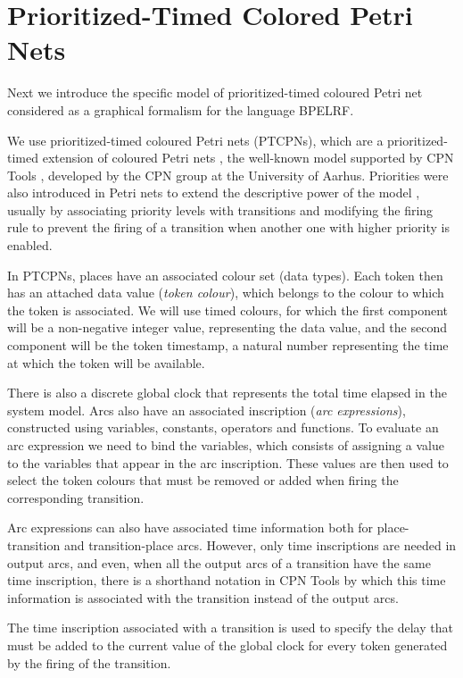 \section{Prioritized-Timed Colored Petri Nets}\label{petrinet}

Next we introduce the specific model of prioritized-timed
coloured Petri net considered as a graphical formalism for the language BPELRF. 
 

We use prioritized-timed coloured Petri nets (PTCPNs), 
which are
a prioritized-timed extension of coloured Petri nets \cite{Jensen97},
the well-known model supported by CPN Tools \cite{CPNTools},
developed by the CPN group at the University of Aarhus.
Priorities were also introduced in Petri nets to extend the descriptive 
power of the model \cite{Bau96,Best92,Pet81}, usually by
associating priority levels with transitions and modifying the firing
rule to prevent the firing of a transition when another one with
higher priority is enabled.

In PTCPNs, places have an associated colour set (data types). 
Each token then  has  an attached data value
({\em token colour}),
which belongs to the colour to which the token is
associated. We will use timed colours, for which the first component
will be a non-negative integer value, representing the data value,
and the second component will be the token timestamp,
a natural number representing the time at which the 
token will be available.

There is also a discrete global clock that represents
the total time elapsed in the system model. Arcs also have 
an associated inscription ({\em arc expressions}),
constructed using variables, constants, operators
and functions. 
To evaluate an arc expression we need to
bind the variables, which consists of assigning
a value to the variables that appear in the
arc inscription. These values are then used to
select the token colours that must be removed or added when
firing the corresponding transition.

Arc expressions can also have associated time information
both for place-transition and transition-place arcs.
However, only time inscriptions are needed
in output arcs, and even, when all the output arcs
of a transition have the same time inscription,
there is a shorthand notation in CPN Tools
by which this time information is associated with
the transition instead of the output arcs.

The time inscription associated with a transition 
is used to specify the delay that must be added to the
current value of the global clock for
every token generated by the firing of the transition.

